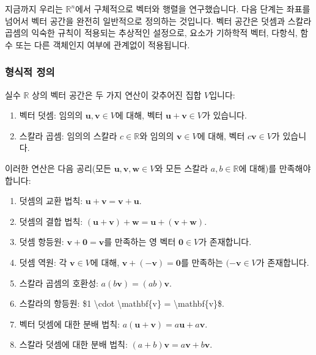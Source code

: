 \documentclass[
  12pt,
  a4paper,
]{article}
\begin{document}
지금까지 우리는 \(\mathbb{R}^n\)에서 구체적으로 벡터와 행렬을 연구했습니다. 다음 단계는 좌표를 넘어서 벡터 공간을 완전히 일반적으로 정의하는 것입니다. 벡터 공간은 덧셈과 스칼라 곱셈의 익숙한 규칙이 적용되는 추상적인 설정으로, 요소가 기하학적 벡터, 다항식, 함수 또는 다른 객체인지 여부에 관계없이 적용됩니다.

\subsubsection{형식적 정의}\label{formal-definition-2}

실수 \(\mathbb{R}\) 상의 벡터 공간은 두 가지 연산이 갖추어진 집합 \(V\)입니다:

\begin{enumerate}
\def\labelenumi{\arabic{enumi}.}
\item
  벡터 덧셈: 임의의 \(\mathbf{u}, \mathbf{v} \in V\)에 대해, 벡터 \(\mathbf{u} + \mathbf{v} \in V\)가 있습니다.
\item
  스칼라 곱셈: 임의의 스칼라 \(c \in \mathbb{R}\)와 임의의 \(\mathbf{v} \in V\)에 대해, 벡터 \(c\mathbf{v} \in V\)가 있습니다.
\end{enumerate}

이러한 연산은 다음 공리(모든 \(\mathbf{u}, \mathbf{v}, \mathbf{w} \in V\)와 모든 스칼라 \(a,b \in \mathbb{R}\)에 대해)를 만족해야 합니다:

\begin{enumerate}
\def\labelenumi{\arabic{enumi}.}
\item
  덧셈의 교환 법칙: \(\mathbf{u} + \mathbf{v} = \mathbf{v} + \mathbf{u}\).
\item
  덧셈의 결합 법칙: \((\mathbf{u} + \mathbf{v}) + \mathbf{w} = \mathbf{u} + (\mathbf{v} + \mathbf{w})\).
\item
  덧셈 항등원: \(\mathbf{v} + \mathbf{0} = \mathbf{v}\)를 만족하는 영 벡터 \(\mathbf{0} \in V\)가 존재합니다.
\item
  덧셈 역원: 각 \(\mathbf{v} \in V\)에 대해, \(\mathbf{v} + (-\mathbf{v}) = \mathbf{0}\)를 만족하는 \((-\mathbf{v} \in V\)가 존재합니다.
\item
  스칼라 곱셈의 호환성: \(a(b\mathbf{v}) = (ab)\mathbf{v}\).
\item
  스칼라의 항등원: \$1 \textbackslash cdot \textbackslash mathbf\{v\} = \textbackslash mathbf\{v\}\$.
\item
  벡터 덧셈에 대한 분배 법칙: \(a(\mathbf{u} + \mathbf{v}) = a\mathbf{u} + a\mathbf{v}\).
\item
  스칼라 덧셈에 대한 분배 법칙: \((a+b)\mathbf{v} = a\mathbf{v} + b\mathbf{v}\).
\end{enumerate}
\end{document}
